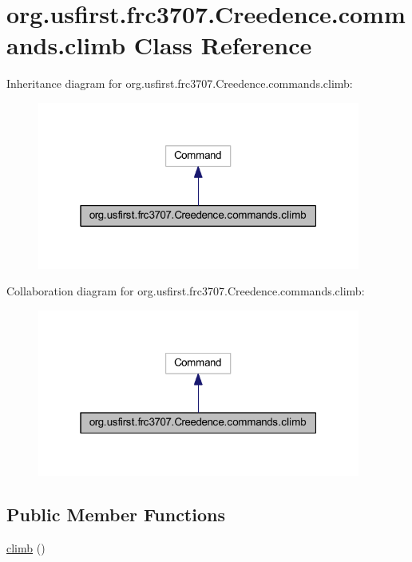 \hypertarget{classorg_1_1usfirst_1_1frc3707_1_1_creedence_1_1commands_1_1climb}{}\section{org.\+usfirst.\+frc3707.\+Creedence.\+commands.\+climb Class Reference}
\label{classorg_1_1usfirst_1_1frc3707_1_1_creedence_1_1commands_1_1climb}


Inheritance diagram for org.\+usfirst.\+frc3707.\+Creedence.\+commands.\+climb\+:
\nopagebreak
\begin{figure}[H]
\begin{center}
\leavevmode
\includegraphics[width=301pt]{classorg_1_1usfirst_1_1frc3707_1_1_creedence_1_1commands_1_1climb__inherit__graph}
\end{center}
\end{figure}


Collaboration diagram for org.\+usfirst.\+frc3707.\+Creedence.\+commands.\+climb\+:
\nopagebreak
\begin{figure}[H]
\begin{center}
\leavevmode
\includegraphics[width=301pt]{classorg_1_1usfirst_1_1frc3707_1_1_creedence_1_1commands_1_1climb__coll__graph}
\end{center}
\end{figure}
\subsection*{Public Member Functions}
\begin{DoxyCompactItemize}
\item 
\mbox{\hyperlink{classorg_1_1usfirst_1_1frc3707_1_1_creedence_1_1commands_1_1climb_ab3ba6a9b468e18a358e68d8c05fac1ba}{climb}} ()
\end{DoxyCompactItemize}
